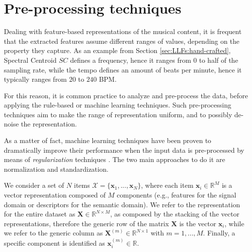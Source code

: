 


\section{Pre-processing techniques}\label{sec:ML:data}  
Dealing with feature-based representations of the musical content, it is frequent that the extracted features assume different ranges of values, depending on the property they capture. As an example from Section \ref{sec:LLFs:hand-crafted}, Spectral Centroid $SC$ defines a frequency, hence it ranges from 0 to half of the sampling rate, while the tempo defines an amount of beats per minute, hence it typically ranges from $20$ to $240$ BPM. 

For this reason, it is common practice to analyze and pre-process the data, before applying the rule-based or machine learning techniques. Such pre-processing techniques aim to make the range of representation uniform, and to possibly de-noise the representation. 

As a matter of fact, machine learning techniques have been proven to dramatically improve their performance when the input data is pre-processed by means of \textit{regularization} techniques \cite{PAMI}. The two main approaches to do it are normalization and standardization. 

We consider a set of $N$ items  $\mathcal{X}=\{\mathbf{x}_1,...,\mathbf{x}_N\}$, where each item $\mathbf{x}_i \in \mathbb{R}^{M}$ is a vector representation composed of $M$ components (e.g., features for the signal domain or descriptors for the semantic domain).  We refer to the representation for the entire dataset as $\mathbf{X}\in \mathbb{R}^{N \times M}$, as composed by the stacking of the vector representations, therefore the generic row of the matrix $\mathbf{X}$ is the vector  $\mathbf{x}_i$, while we refer to the generic column as $\mathbf{X}^{(m)}\in \mathbb{R}^{N \times 1}$ with $m=1,...,M$. Finally, a specific component is identified as $\mathbf{x}_{i}^{(m)}\in \mathbb{R}$.

